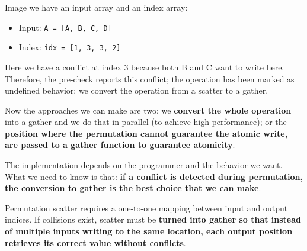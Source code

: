 \begin{itemize}
    \begin{examplebox}
        Image we have an input array and an index array:
        \begin{itemize}
            \item Input: \texttt{A = [A, B, C, D]}
            \item Index: \texttt{idx = [1, 3, 3, 2]}
        \end{itemize}
        Here we have a conflict at index 3 because both B and C want to write here. Therefore, the pre-check reports this conflict; the operation has been marked as undefined behavior; we convert the operation from a scatter to a gather.

        \highspace
        Now the approaches we can make are two: we \textbf{convert the whole operation} into a gather and we do that in parallel (to achieve high performance); or the \textbf{position where the permutation cannot guarantee the atomic write, are passed to a gather function to guarantee atomicity}.

        \highspace
        The implementation depends on the programmer and the behavior we want. What we need to know is that: \textbf{if a conflict is detected during permutation, the conversion to gather is the best choice that we can make}.
    \end{examplebox}

    Permutation scatter requires a one-to-one mapping between input and output indices. If collisions exist, scatter must be \textbf{turned into gather so that instead of multiple inputs writing to the same location, each output position retrieves its correct value without conflicts}.
\end{itemize}

